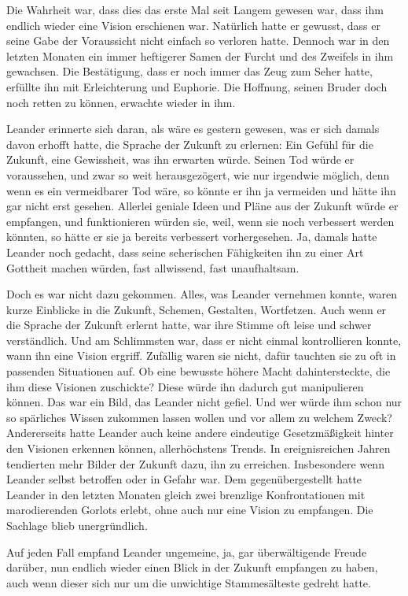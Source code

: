 Die Wahrheit war, dass dies das erste Mal seit Langem gewesen war, dass ihm endlich wieder eine Vision erschienen war. Natürlich hatte er gewusst, dass er seine Gabe der Voraussicht nicht einfach so verloren hatte. Dennoch war in den letzten Monaten ein immer heftigerer Samen der Furcht und des Zweifels in ihm gewachsen. Die Bestätigung, dass er noch immer das Zeug zum Seher hatte, erfüllte ihn mit Erleichterung und Euphorie. Die Hoffnung, seinen Bruder doch noch retten zu können, erwachte wieder in ihm.

Leander erinnerte sich daran, als wäre es gestern gewesen, was er sich damals davon erhofft hatte, die Sprache der Zukunft zu erlernen: Ein Gefühl für die Zukunft, eine Gewissheit, was ihn erwarten würde. Seinen Tod würde er voraussehen, und zwar so weit herausgezögert, wie nur irgendwie möglich, denn wenn es ein vermeidbarer Tod wäre, so könnte er ihn ja vermeiden und hätte ihn gar nicht erst gesehen. Allerlei geniale Ideen und Pläne aus der Zukunft würde er empfangen, und funktionieren würden sie, weil, wenn sie noch verbessert werden könnten, so hätte er sie ja bereits verbessert vorhergesehen. Ja, damals hatte Leander noch gedacht, dass seine seherischen Fähigkeiten ihn zu einer Art Gottheit machen würden, fast allwissend, fast unaufhaltsam.

Doch es war nicht dazu gekommen. Alles, was Leander vernehmen konnte, waren kurze Einblicke in die Zukunft, Schemen, Gestalten, Wortfetzen. Auch wenn er die Sprache der Zukunft erlernt hatte, war ihre Stimme oft leise und schwer verständlich. Und am Schlimmsten war, dass er nicht einmal kontrollieren konnte, wann ihn eine Vision ergriff. Zufällig waren sie nicht, dafür tauchten sie zu oft in passenden Situationen auf. Ob eine bewusste höhere Macht dahintersteckte, die ihm diese Visionen zuschickte? Diese würde ihn dadurch gut manipulieren können. Das war ein Bild, das Leander nicht gefiel. Und wer würde ihm schon nur so spärliches Wissen zukommen lassen wollen und vor allem zu welchem Zweck? Andererseits hatte Leander auch keine andere eindeutige Gesetzmäßigkeit hinter den Visionen erkennen können, allerhöchstens Trends. In ereignisreichen Jahren tendierten mehr Bilder der Zukunft dazu, ihn zu erreichen. Insbesondere wenn Leander selbst betroffen oder in Gefahr war. Dem gegenübergestellt hatte Leander in den letzten Monaten gleich zwei brenzlige Konfrontationen mit marodierenden Gorlots erlebt, ohne auch nur eine Vision zu empfangen. Die Sachlage blieb unergründlich.

Auf jeden Fall empfand Leander ungemeine, ja, gar überwältigende Freude darüber, nun endlich wieder einen Blick in der Zukunft empfangen zu haben, auch wenn dieser sich nur um die unwichtige Stammesälteste gedreht hatte.


